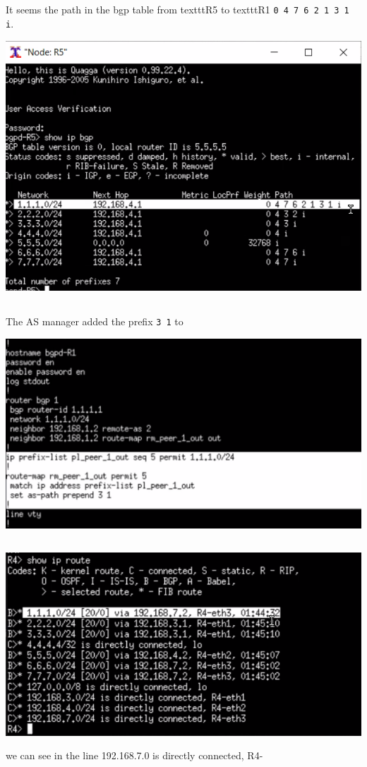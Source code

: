 \subsection{}
It seems the path in the bgp table from texttt{R5} to texttt{R1} \texttt{0 4 7 6 2 1 3 1 i}.
\begin{center}
    \includegraphics[width=1.2 \textwidth]{resources/q4-2.png}\centering
\end{center}

\subsection{}
The AS manager added the prefix \texttt{3 1} to 
\begin{center}
    \includegraphics[width=1.2 \textwidth]{resources/q4-3.png}\centering
\end{center}

\subsection{}
\begin{center}
    \includegraphics[width=1.2 \textwidth]{resources/q4-4.png}\centering
\end{center}
 we can see in the line 192.168.7.0 is directly connected, R4-
